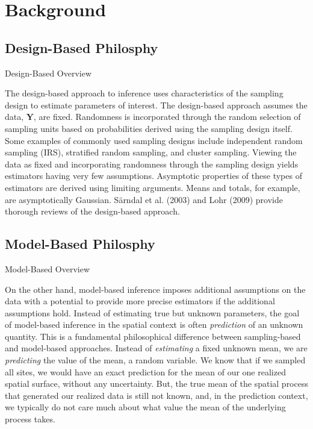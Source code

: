 \documentclass[]{elsarticle} %
\begin{document}
\hypertarget{background}{%
\section{Background}\label{background}}

\hypertarget{design-based-philosphy}{%
\subsection{Design-Based Philosphy}\label{design-based-philosphy}}

Design-Based Overview

The design-based approach to inference uses characteristics of the
sampling design to estimate parameters of interest. The design-based
approach assumes the data, \(\mathbf{Y}\), are fixed. Randomness is
incorporated through the random selection of sampling units based on
probabilities derived using the sampling design itself. Some examples of
commonly used sampling designs include independent random sampling
(IRS), stratified random sampling, and cluster sampling. Viewing the
data as fixed and incorporating randomness through the sampling design
yields estimators having very few assumptions. Asymptotic properties of
these types of estimators are derived using limiting arguments. Means
and totals, for example, are asymptotically Gaussian. Särndal et al.
(2003) and Lohr (2009) provide thorough reviews of the design-based
approach.

\hypertarget{model-based-philosphy}{%
\subsection{Model-Based Philosphy}\label{model-based-philosphy}}

Model-Based Overview

On the other hand, model-based inference imposes additional assumptions
on the data with a potential to provide more precise estimators if the
additional assumptions hold. Instead of estimating true but unknown
parameters, the goal of model-based inference in the spatial context is
often \emph{prediction} of an unknown quantity. This is a fundamental
philosophical difference between sampling-based and model-based
approaches. Instead of \emph{estimating} a fixed unknown mean, we are
\emph{predicting} the value of the mean, a random variable. We know that
if we sampled all sites, we would have an exact prediction for the mean
of our one realized spatial surface, without any uncertainty. But, the
true mean of the spatial process that generated our realized data is
still not known, and, in the prediction context, we typically do not
care much about what value the mean of the underlying process takes.
\end{document}
